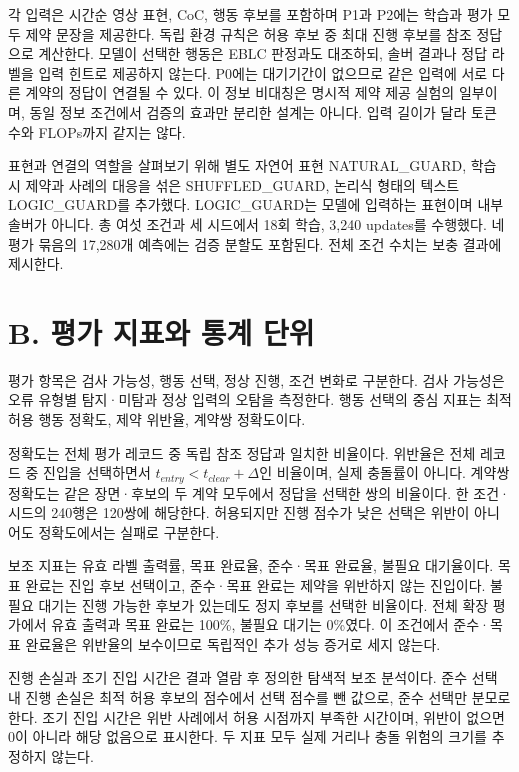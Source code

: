 \documentclass[11pt,a4paper]{article}
\begin{document}
각 입력은 시간순 영상 표현, CoC, 행동 후보를 포함하며 P1과 P2에는 학습과 평가 모두 제약 문장을 제공한다. 독립 환경 규칙은 허용 후보 중 최대 진행 후보를 참조 정답으로 계산한다. 모델이 선택한 행동은 EBLC 판정과도 대조하되, 솔버 결과나 정답 라벨을 입력 힌트로 제공하지 않는다. P0에는 대기기간이 없으므로 같은 입력에 서로 다른 계약의 정답이 연결될 수 있다. 이 정보 비대칭은 명시적 제약 제공 실험의 일부이며, 동일 정보 조건에서 검증의 효과만 분리한 설계는 아니다. 입력 길이가 달라 토큰 수와 FLOPs까지 같지는 않다.\par

표현과 연결의 역할을 살펴보기 위해 별도 자연어 표현 NATURAL\_GUARD, 학습 시 제약과 사례의 대응을 섞은 SHUFFLED\_GUARD, 논리식 형태의 텍스트 LOGIC\_GUARD를 추가했다. LOGIC\_GUARD는 모델에 입력하는 표현이며 내부 솔버가 아니다. 총 여섯 조건과 세 시드에서 18회 학습, 3,240 updates를 수행했다. 네 평가 묶음의 17,280개 예측에는 검증 분할도 포함된다. 전체 조건 수치는 보충 결과에 제시한다.\par

\section*{B. 평가 지표와 통계 단위}

평가 항목은 검사 가능성, 행동 선택, 정상 진행, 조건 변화로 구분한다. 검사 가능성은 오류 유형별 탐지·미탐과 정상 입력의 오탐을 측정한다. 행동 선택의 중심 지표는 최적 허용 행동 정확도, 제약 위반율, 계약쌍 정확도이다.\par

정확도는 전체 평가 레코드 중 독립 참조 정답과 일치한 비율이다. 위반율은 전체 레코드 중 진입을 선택하면서 \(t_{entry}<t_{clear}+\Delta\)인 비율이며, 실제 충돌률이 아니다. 계약쌍 정확도는 같은 장면·후보의 두 계약 모두에서 정답을 선택한 쌍의 비율이다. 한 조건·시드의 240행은 120쌍에 해당한다. 허용되지만 진행 점수가 낮은 선택은 위반이 아니어도 정확도에서는 실패로 구분한다.\par

보조 지표는 유효 라벨 출력률, 목표 완료율, 준수·목표 완료율, 불필요 대기율이다. 목표 완료는 진입 후보 선택이고, 준수·목표 완료는 제약을 위반하지 않는 진입이다. 불필요 대기는 진행 가능한 후보가 있는데도 정지 후보를 선택한 비율이다. 전체 확장 평가에서 유효 출력과 목표 완료는 100\%, 불필요 대기는 0\%였다. 이 조건에서 준수·목표 완료율은 위반율의 보수이므로 독립적인 추가 성능 증거로 세지 않는다.\par

진행 손실과 조기 진입 시간은 결과 열람 후 정의한 탐색적 보조 분석이다. 준수 선택 내 진행 손실은 최적 허용 후보의 점수에서 선택 점수를 뺀 값으로, 준수 선택만 분모로 한다. 조기 진입 시간은 위반 사례에서 허용 시점까지 부족한 시간이며, 위반이 없으면 0이 아니라 해당 없음으로 표시한다. 두 지표 모두 실제 거리나 충돌 위험의 크기를 추정하지 않는다.\par
\end{document}
